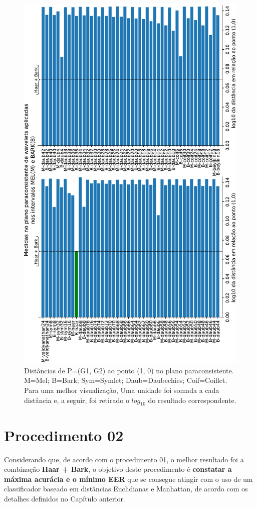 	\newpage
	\begin{landscape}
		\begin{figure}[h]
			\centering
			\includegraphics[width=0.6\linewidth,angle=-90]{images/results/paraconsistentPlane/ParaconsistentFull.pdf}
			\caption{Distâncias de P=(G1, G2) ao ponto (1, 0) no plano paraconsistente. M=Mel; B=Bark; Sym=Symlet; Daub=Daubechies; Coif=Coiflet. Para uma melhor visualização, Uma unidade foi somada a cada distância e, a seguir, foi retirado o $log_{10}$ do resultado correspondente.}
			\label{fig:paraconsistentfull}
		\end{figure}
	\end{landscape}
	\newpage
	
	\FloatBarrier
	
	
	\disableClearpage
	
	\section{Procedimento 02} \label{chap:testsResults:sec:Experimento02}
		\enableClearpage
	
		\par Considerando que, de acordo com o procedimento 01, o melhor resultado foi a combinação \textbf{Haar + Bark}, o objetivo deste procedimento é \textbf{constatar a máxima acurácia e o mínimo EER} que se consegue atingir com o uso de um classificador baseado em distâncias Euclidianas e Manhattan, de acordo com os detalhes definidos no Capítulo anterior.
		
